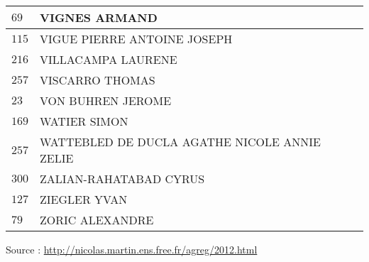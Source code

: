 \begin{xltabular}{\linewidth}{|l|X|}
    \hline
    $69$ & VIGNES ARMAND \\
    \hline
    $115$ & VIGUE PIERRE ANTOINE JOSEPH \\
    \hline
    $216$ & VILLACAMPA LAURENE \\
    \hline
    $257$ & VISCARRO THOMAS \\
    \hline
    $23$ & VON BUHREN JEROME \\
    \hline
    $169$ & WATIER SIMON \\
    \hline
    $257$ & WATTEBLED DE DUCLA AGATHE NICOLE ANNIE ZELIE \\
    \hline
    $300$ & ZALIAN-RAHATABAD CYRUS \\
    \hline
    $127$ & ZIEGLER YVAN \\
    \hline
    $79$ & ZORIC ALEXANDRE \\
    \hline
  \end{xltabular}

  \begin{flushright}
    {\tiny Source : \url{http://nicolas.martin.ens.free.fr/agreg/2012.html}}
  \end{flushright}

